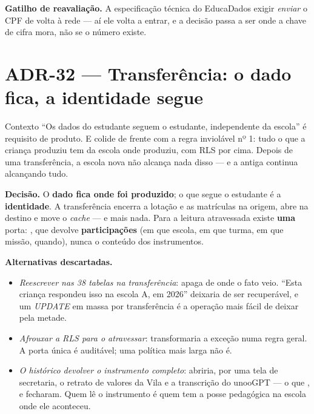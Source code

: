 \textbf{Gatilho de reavaliação.} A especificação técnica do EducaDados exigir
\emph{enviar} o CPF de volta à rede --- aí ele volta a entrar, e a decisão passa a
ser onde a chave de cifra mora, não se o número existe.

\section{ADR-32 --- Transferência: o dado fica, a identidade segue}
\label{adr:transferencia}

\begin{especificacao}{Contexto}
\enquote{Os dados do estudante seguem o estudante, independente da escola} é requisito de
produto. E colide de frente com a regra inviolável nº 1: tudo o que a criança
produziu tem  da escola onde produziu, com RLS por cima. Depois de
uma transferência, a escola nova não alcança nada disso --- e a antiga continua
alcançando tudo.
\end{especificacao}

\textbf{Decisão.} O \textbf{dado fica onde foi produzido}; o que segue o estudante é a
\textbf{identidade}. A transferência encerra a lotação e as matrículas na origem,
abre na destino e move o \emph{cache}  --- e mais nada. Para
a leitura atravessada existe \textbf{uma} porta: ,
que devolve \textbf{participações} (em que escola, em que turma, em que missão,
quando), nunca o conteúdo dos instrumentos.

\textbf{Alternativas descartadas.}
\begin{itemize}
  \item \emph{Reescrever  nas 38 tabelas na transferência}: apaga
    de onde o fato veio. \enquote{Esta criança respondeu isso na escola A, em
    2026} deixaria de ser recuperável, e um \emph{UPDATE} em massa por
    transferência é a operação mais fácil de deixar pela metade.
  \item \emph{Afrouxar a RLS para o  atravessar}: transformaria a
    exceção numa regra geral. A porta única é auditável; uma política mais larga
    não é.
  \item \emph{O histórico devolver o instrumento completo}: abriria, por uma tela
    de secretaria, o retrato de valores da Vila e a transcrição do unooGPT --- o
    que ,  e  fecharam. Quem lê o
    instrumento é quem tem a posse pedagógica na escola onde ele aconteceu.
\end{itemize}

